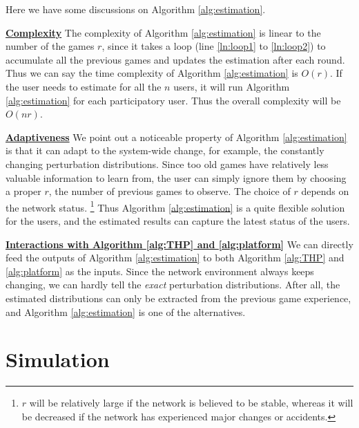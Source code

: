 \documentclass{IEEEtran}
\begin{document}
{\color{black}
Here we have some discussions on Algorithm \ref{alg:estimation}.

\noindent \textbf{\underline{Complexity}} The complexity of Algorithm \ref{alg:estimation} is linear to the number of the games $r$, since it takes a loop (line \ref{ln:loop1} to \ref{ln:loop2}) to accumulate all the previous games and updates the estimation after each round. Thus we can say the time complexity of Algorithm \ref{alg:estimation} is $O(r)$. If the user needs to estimate for all the $n$ users, it will run Algorithm \ref{alg:estimation} for each participatory user. Thus the overall complexity will be $O(nr)$.

\noindent \textbf{\underline{Adaptiveness}} We point out a noticeable property of Algorithm \ref{alg:estimation} is that it can adapt to the system-wide change, for example, the constantly changing perturbation distributions. Since too old games have relatively less valuable information to learn from, the user can simply ignore them by choosing a proper $r$, the number of previous games to observe. The choice of $r$ depends on the network status. \footnote{$r$ will be relatively large if the network is believed to be stable, whereas it will be decreased if the network has experienced major changes or accidents.} Thus Algorithm \ref{alg:estimation} is a quite flexible solution for the users, and the estimated results can capture the latest status of the users.

\noindent \textbf{\underline{Interactions with Algorithm \ref{alg:THP} and \ref{alg:platform}}} We can directly feed the outputs of Algorithm \ref{alg:estimation} to both Algorithm \ref{alg:THP} and \ref{alg:platform} as the inputs. Since the network environment always keeps changing, we can hardly tell the \emph{exact} perturbation distributions. After all, the estimated distributions can only be extracted from the previous game experience, and Algorithm \ref{alg:estimation} is one of the alternatives.
}

\section{Simulation}
\label{sec:simulation}
\end{document}
